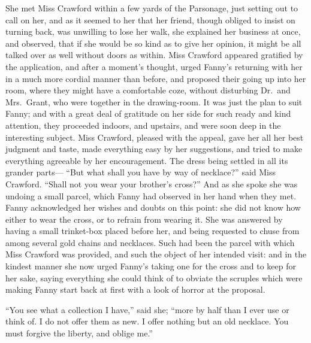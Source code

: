 She met Miss Crawford within a few yards of the Parsonage,
just setting out to call on her, and as it seemed to her
that her friend, though obliged to insist on turning back,
was unwilling to lose her walk, she explained her business
at once, and observed, that if she would be so kind
as to give her opinion, it might be all talked over as
well without doors as within.  Miss Crawford appeared
gratified by the application, and after a moment's thought,
urged Fanny's returning with her in a much more cordial
manner than before, and proposed their going up into
her room, where they might have a comfortable coze,
without disturbing Dr.\ and Mrs.\ Grant, who were together
in the drawing-room. It was just the plan to suit Fanny;
and with a great deal of gratitude on her side for such ready
and kind attention, they proceeded indoors, and upstairs,
and were soon deep in the interesting subject.  Miss Crawford,
pleased with the appeal, gave her all her best judgment
and taste, made everything easy by her suggestions,
and tried to make everything agreeable by her encouragement.
The dress being settled in all its grander parts---%
``But what shall you have by way of necklace?'' said Miss
Crawford.  ``Shall not you wear your brother's cross?''
And as she spoke she was undoing a small parcel,
which Fanny had observed in her hand when they met.
Fanny acknowledged her wishes and doubts on this point:
she did not know how either to wear the cross, or to
refrain from wearing it.  She was answered by having
a small trinket-box placed before her, and being requested
to chuse from among several gold chains and necklaces.
Such had been the parcel with which Miss Crawford
was provided, and such the object of her intended visit:
and in the kindest manner she now urged Fanny's taking one
for the cross and to keep for her sake, saying everything
she could think of to obviate the scruples which were
making Fanny start back at first with a look of horror at
the proposal.

``You see what a collection I have,'' said she; ``more by half
than I ever use or think of.  I do not offer them as new.
I offer nothing but an old necklace.  You must forgive
the liberty, and oblige me.''

